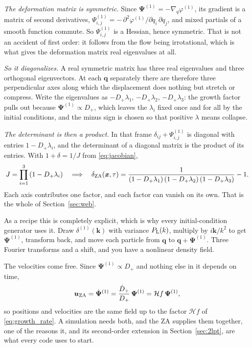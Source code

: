 \documentclass[a4paper,11pt]{article}
\newcommand{\vx}{\bm{x}}
\newcommand{\vq}{\bm{q}}
\newcommand{\vk}{\bm{k}}
\newcommand{\vu}{\bm{u}}
\newcommand{\vPsi}{\bm{\Psi}}
\def\cH{\mathcal{H}}
\def\Plin{P_{\rm L}}
\numberwithin{equation}{section}
\begin{document}
\emph{The deformation matrix is symmetric.} Since $\vPsi^{(1)} =
-\nabla_q\varphi^{(1)}$, its gradient is a matrix of second derivatives,
$\Psi^{(1)}_{i,j} = -\,\partial^2\varphi^{(1)}/\partial q_i\,\partial q_j$, and
mixed partials of a smooth function commute. So $\Psi^{(1)}_{i,j}$ is a Hessian,
hence symmetric. That is not an accident of first order: it follows from the
flow being irrotational, which is what gives the deformation matrix real
eigenvalues at all.

\emph{So it diagonalizes.} A real symmetric matrix has three real eigenvalues
and three orthogonal eigenvectors. At each $\vq$ separately there are therefore
three perpendicular axes along which the displacement does nothing but stretch
or compress. Write the eigenvalues as $-D_+\lambda_1$, $-D_+\lambda_2$,
$-D_+\lambda_3$: the growth factor pulls out because $\vPsi^{(1)} \propto D_+$,
which leaves the $\lambda_i$ fixed once and for all by the initial conditions,
and the minus sign is chosen so that positive $\lambda$ means collapse.

\emph{The determinant is then a product.} In that frame $\delta_{ij} +
\Psi^{(1)}_{i,j}$ is diagonal with entries $1-D_+\lambda_i$, and the determinant
of a diagonal matrix is the product of its entries. With $1+\delta = 1/J$ from
\eqref{eq:jacobian},
\begin{equation}
J = \prod_{i=1}^{3}\left(1 - D_+\lambda_i\right)
\quad\Longrightarrow\quad
\delta_{\rm ZA}(\vx,\tau)
= \frac{1}{\left(1-D_+\lambda_1\right)\left(1-D_+\lambda_2\right)\left(1-D_+\lambda_3\right)} - 1 .
\label{eq:za_density}
\end{equation}
Each axis contributes one factor, and each factor can vanish on its own. That is
the whole of Section~\ref{sec:web}.

As a recipe this is completely explicit, which is why every initial-condition
generator uses it. Draw $\delta^{(1)}(\vk)$ with variance $\Plin(k)$, multiply
by $i\vk/k^2$ to get $\vPsi^{(1)}$, transform back, and move each particle from
$\vq$ to $\vq + \vPsi^{(1)}$. Three Fourier transforms and a shift, and you have
a nonlinear density field.

The velocities come free. Since $\vPsi^{(1)} \propto D_+$ and nothing else in it
depends on time,
\begin{equation}
\vu_{\rm ZA} = \dot{\vPsi}^{(1)} = \frac{\dot D_+}{D_+}\,\vPsi^{(1)}
= \cH f\,\vPsi^{(1)} ,
\label{eq:za_velocity}
\end{equation}
so positions and velocities are the same field up to the factor $\cH f$ of
\eqref{eq:growth_rate}. A simulation needs both, and the ZA supplies them together, one of the reasons it, and its second-order extension in
Section~\ref{sec:2lpt}, are what every code uses to start.
\end{document}

